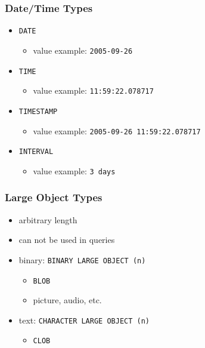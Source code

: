 \documentclass[dvipsnames]{beamer}
\theoremstyle{plain}
\begin{document}
\begin{frame}
  \frametitle{Date/Time Types}

  \begin{itemize}
    \item \lstinline!DATE!
    \begin{itemize}
      \item value example: \texttt{2005-09-26}
    \end{itemize}

    \pause
    \medskip
    \item \lstinline!TIME!
    \begin{itemize}
      \item value example: \texttt{11:59:22.078717}
    \end{itemize}

    \pause
    \medskip
    \item \lstinline!TIMESTAMP!
    \begin{itemize}
      \item value example: \texttt{2005-09-26 11:59:22.078717}
    \end{itemize}

    \pause
    \medskip
    \item \lstinline!INTERVAL!
    \begin{itemize}
      \item value example: \texttt{3 days}
    \end{itemize}
  \end{itemize}
\end{frame}

\begin{frame}
  \frametitle{Large Object Types}

  \begin{itemize}
    \item arbitrary length
    \item can not be used in queries

    \pause
    \bigskip
    \item binary: \lstinline!BINARY LARGE OBJECT (n)!
    \begin{itemize}
      \item \lstinline!BLOB!
      \item picture, audio, etc.
    \end{itemize}

    \pause
    \item text: \lstinline!CHARACTER LARGE OBJECT (n)!
    \begin{itemize}
      \item \lstinline!CLOB!
    \end{itemize}
  \end{itemize}
\end{frame}
\end{document}
